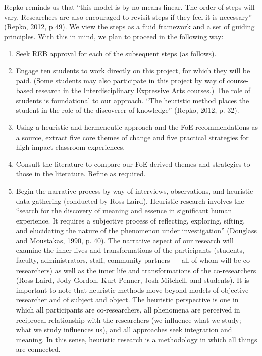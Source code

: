 \documentclass[letterpaper,10pt,headsepline]{scrreprt}
\begin{document}
Repko reminds us that ``this model is by no means linear. The order of steps
will vary. Researchers are also encouraged to revisit steps if they feel it is
necessary'' (Repko, 2012, p 49). We view the steps as a fluid framework and a
set of guiding principles. With this in mind, we plan to proceed in the
following way:

\begin{enumerate}

\item Seek REB approval for each of the subsequent steps (as follows).

\item Engage ten students to work directly on this project, for which they
  will be paid. (Some students may also participate in this project by way of
  course-based research in the Interdisciplinary Expressive Arts courses.) The
  role of students is foundational to our approach. ``The heuristic method
  places the student in the role of the discoverer of knowledge'' (Repko,
  2012, p. 32).

\item Using a heuristic and hermeneutic approach and the FoE recommendations
  as a source, extract five core themes of change and five practical
  strategies for high-impact classroom experiences.

\item Consult the literature to compare our FoE-derived themes and strategies
  to those in the literature. Refine as required.

\item Begin the narrative process by way of interviews, observations, and
  heuristic data-gathering (conducted by Ross Laird). Heuristic research
  involves the ``search for the discovery of meaning and essence in
  significant human experience. It requires a subjective process of
  reflecting, exploring, sifting, and elucidating the nature of the phenomenon
  under investigation'' (Douglass and Moustakas, 1990, p. 40). The narrative
  aspect of our research will examine the inner lives and transformations of
  the participants (students, faculty, administrators, staff, community
  partners --- all of whom will be co-researchers) as well as the inner life
  and transformations of the co-researchers (Ross Laird, Jody Gordon, Kurt
  Penner, Josh Mitchell, and students). It is important to note that heuristic
  methods move beyond models of objective researcher and of subject and
  object. The heuristic perspective is one in which all participants are
  co-researchers, all phenomena are perceived in reciprocal relationship with
  the researchers (we influence what we study; what we study influences us),
  and all approaches seek integration and meaning. In this sense, heuristic
  research is a methodology in which all things are connected.


\end{enumerate}
\end{document}
